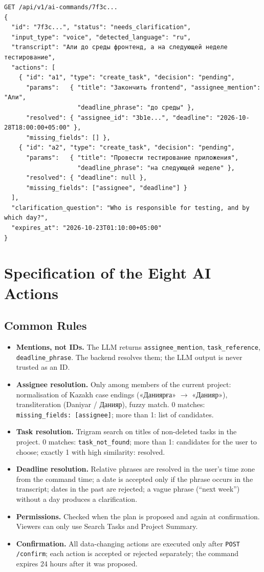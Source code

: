 \documentclass[11pt,a4paper]{article}
\newcommand{\code}[1]{\texttt{#1}}
\begin{document}
\begin{Verbatim}
GET /api/v1/ai-commands/7f3c...
{
  "id": "7f3c...", "status": "needs_clarification",
  "input_type": "voice", "detected_language": "ru",
  "transcript": "Али до среды фронтенд, а на следующей неделе тестирование",
  "actions": [
    { "id": "a1", "type": "create_task", "decision": "pending",
      "params":   { "title": "Закончить frontend", "assignee_mention": "Али",
                    "deadline_phrase": "до среды" },
      "resolved": { "assignee_id": "3b1e...", "deadline": "2026-10-28T18:00:00+05:00" },
      "missing_fields": [] },
    { "id": "a2", "type": "create_task", "decision": "pending",
      "params":   { "title": "Провести тестирование приложения",
                    "deadline_phrase": "на следующей неделе" },
      "resolved": { "deadline": null },
      "missing_fields": ["assignee", "deadline"] }
  ],
  "clarification_question": "Who is responsible for testing, and by which day?",
  "expires_at": "2026-10-23T01:10:00+05:00"
}
\end{Verbatim}

\section{Specification of the Eight AI Actions}

\subsection{Common Rules}

\begin{itemize}
  \item \textbf{Mentions, not IDs.} The LLM returns \code{assignee\_mention}, \code{task\_reference}, \code{deadline\_phrase}. The backend resolves them; the LLM output is never trusted as an ID.
  \item \textbf{Assignee resolution.} Only among members of the current project: normalisation of Kazakh case endings («Даниярға» $\rightarrow$ «Данияр»), transliteration (Daniyar / Данияр), fuzzy match. 0 matches: \code{missing\_fields: [assignee]}; more than 1: list of candidates.
  \item \textbf{Task resolution.} Trigram search on titles of non-deleted tasks in the project. 0 matches: \code{task\_not\_found}; more than 1: candidates for the user to choose; exactly 1 with high similarity: resolved.
  \item \textbf{Deadline resolution.} Relative phrases are resolved in the user's time zone from the command time; a date is accepted only if the phrase occurs in the transcript; dates in the past are rejected; a vague phrase (``next week'') without a day produces a clarification.
  \item \textbf{Permissions.} Checked when the plan is proposed and again at confirmation. Viewers can only use Search Tasks and Project Summary.
  \item \textbf{Confirmation.} All data-changing actions are executed only after \code{POST /confirm}; each action is accepted or rejected separately; the command expires 24 hours after it was proposed.
\end{itemize}
\end{document}
